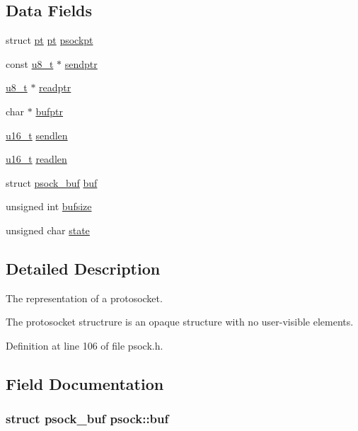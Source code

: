 \subsection*{Data Fields}
\begin{DoxyCompactItemize}
\item 
struct \hyperlink{structpt}{pt} \hyperlink{structpt}{pt} \hyperlink{structpsock_a17aacf7c5e2046c1f3ab50faa1b2f7eb}{psockpt}
\item 
const \hyperlink{group__uipfw_ga4caecabca98b43919dd11be1c0d4cd8e}{u8\_\-t} $\ast$ \hyperlink{structpsock_a31f25efccba9fd043047133d0d0ba5ab}{sendptr}
\item 
\hyperlink{group__uipfw_ga4caecabca98b43919dd11be1c0d4cd8e}{u8\_\-t} $\ast$ \hyperlink{structpsock_ab973f2e16c2883a8a0164d716cce5a31}{readptr}
\item 
char $\ast$ \hyperlink{structpsock_ac3d1bfbb1abde31973c015de97ce2f84}{bufptr}
\item 
\hyperlink{group__uipfw_ga77570ac4fcab86864fa1916e55676da2}{u16\_\-t} \hyperlink{structpsock_a19b82696bd84a803250cbf9812f2f125}{sendlen}
\item 
\hyperlink{group__uipfw_ga77570ac4fcab86864fa1916e55676da2}{u16\_\-t} \hyperlink{structpsock_aa408ca8630154ebd039f37a828399f7b}{readlen}
\item 
struct \hyperlink{structpsock__buf}{psock\_\-buf} \hyperlink{structpsock_ad6bd03239291629676e4c0286ebb650f}{buf}
\item 
unsigned int \hyperlink{structpsock_aa6bfaf327ce839ba70accd71014398d0}{bufsize}
\item 
unsigned char \hyperlink{structpsock_afda184638130452f3570966acc5b97f9}{state}
\end{DoxyCompactItemize}


\subsection{Detailed Description}
The representation of a protosocket.

The protosocket structrure is an opaque structure with no user-\/visible elements. 

Definition at line 106 of file psock.h.



\subsection{Field Documentation}
\hypertarget{structpsock_ad6bd03239291629676e4c0286ebb650f}{
\subsubsection[{buf}]{\setlength{\rightskip}{0pt plus 5cm}struct {\bf psock\_\-buf} {\bf psock::buf}}}
\label{structpsock_ad6bd03239291629676e4c0286ebb650f}


